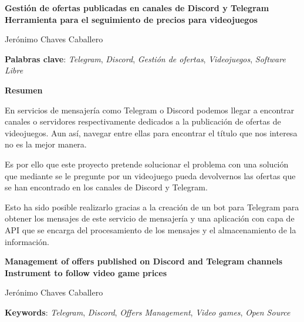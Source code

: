 \thispagestyle{empty}

\begin{center}
{\large\bfseries Gestión de ofertas publicadas en canales de Discord y Telegram \\ Herramienta para el seguimiento de precios para videojuegos }\\
\end{center}
\begin{center}
Jerónimo Chaves Caballero\\
\end{center}


\vspace{0.5cm}
\noindent\textbf{Palabras clave}: \textit{Telegram}, \textit{Discord}, \textit{Gestión de ofertas}, \textit{Videojuegos}, \textit{Software Libre}
\vspace{0.7cm}

\noindent\textbf{Resumen}

En servicios de mensajería como Telegram o Discord podemos llegar a encontrar 
canales o servidores respectivamente dedicados a la publicación de ofertas de
videojuegos. Aun así, navegar entre ellas para encontrar el título que nos interesa 
no es la mejor manera.

Es por ello que este proyecto pretende solucionar el problema con una solución que
mediante se le pregunte por un videojuego pueda devolvernos las ofertas que se han 
encontrado en los canales de Discord y Telegram.

Esto ha sido posible realizarlo gracias a la creación de un bot para Telegram para 
obtener los mensajes de este servicio de mensajería y una aplicación con capa de 
API que se encarga del procesamiento de los mensajes y el almacenamiento de la 
información.

\cleardoublepage

\begin{center}
	{\large\bfseries Management of offers published on Discord and Telegram channels \\ Instrument to follow video game prices}\\
\end{center}
\begin{center}
	Jerónimo Chaves Caballero\\
\end{center}
\vspace{0.5cm}
\noindent\textbf{Keywords}: \textit{Telegram}, \textit{Discord}, \textit{Offers Management}, \textit{Video games}, \textit{Open Source}
\vspace{0.7cm}

